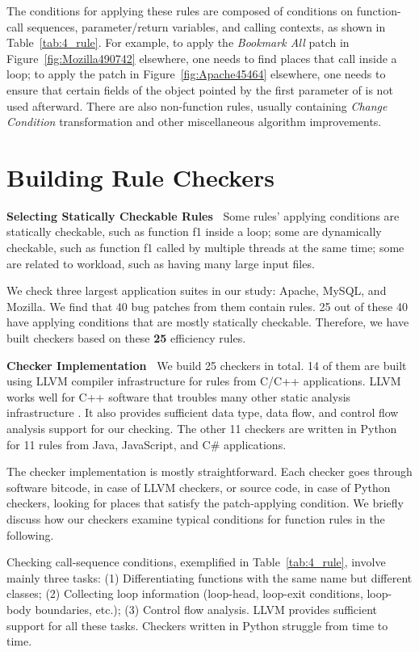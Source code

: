 The conditions for applying these rules are composed of
conditions on function-call sequences,
parameter/return variables,
and calling contexts, as shown in Table~\ref{tab:4_rule}.
For example, to apply the {\it Bookmark All} patch 
in Figure~\ref{fig:Mozilla490742} elsewhere, one 
needs to find places that call  inside a loop;
to apply the patch in Figure~\ref{fig:Apache45464} elsewhere, one needs to ensure
that certain fields of the object pointed by the first parameter of 
 is not used afterward.
There are also non-function rules, 
usually containing {\it Change Condition} transformation and other
miscellaneous algorithm improvements. 


\section{Building Rule Checkers}

{\bf Selecting Statically Checkable Rules\ }
Some rules' applying conditions are statically checkable, such as function f1 
inside a loop; some are dynamically checkable, such as function f1 called by 
multiple threads at the same time; some are related to
workload, such as having many large input files. 

We check three largest application suites in our study: Apache, MySQL, and Mozilla.
We find that 40 bug patches from them contain rules.
25 out of these 40 have applying conditions that are mostly statically
checkable. Therefore, we have built checkers based on these {{\bf 25} 
efficiency rules}.

{\bf Checker Implementation\ }
We build 25 checkers in total. 
14 of them are built using LLVM compiler infrastructure \citep{llvm} for 
rules from C/C++ applications. LLVM works well for C++ software that troubles 
many other static analysis infrastructure \citep{10yearlinux}. 
It also provides sufficient data type, data flow, and control 
flow analysis support for our checking. The other 11 checkers are 
written in Python for 11 rules from Java, JavaScript, and C\# applications.


The checker implementation is mostly straightforward. Each checker goes through 
software bitcode, in case of LLVM checkers, or source code, in case of Python 
checkers, looking for places that satisfy the patch-applying condition. We
briefly discuss how our checkers examine typical conditions for function rules in the following.

Checking call-sequence conditions, exemplified in Table~\ref{tab:4_rule}, involve mainly three tasks: 
(1) Differentiating functions with the same name but different classes; 
(2) Collecting loop information (loop-head, loop-exit conditions, 
loop-body boundaries, etc.); (3) Control flow analysis. 
LLVM provides sufficient support for all these tasks. Checkers written in Python struggle from time to time.

